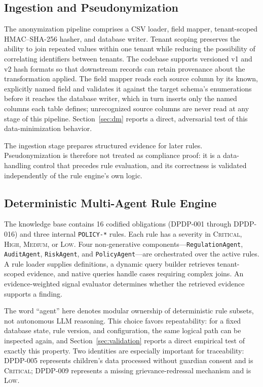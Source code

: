 \documentclass[11pt,a4paper]{article}
\begin{document}
\subsection{Ingestion and Pseudonymization}
The anonymization pipeline comprises a CSV loader, field mapper, tenant-scoped HMAC--SHA-256 hasher, and database writer. Tenant scoping preserves the ability to join repeated values within one tenant while reducing the possibility of correlating identifiers between tenants. The codebase supports versioned v1 and v2 hash formats so that downstream records can retain provenance about the transformation applied. The field mapper reads each source column by its known, explicitly named field and validates it against the target schema's enumerations before it reaches the database writer, which in turn inserts only the named columns each table defines; unrecognized source columns are never read at any stage of this pipeline. Section~\ref{sec:dm} reports a direct, adversarial test of this data-minimization behavior.

The ingestion stage prepares structured evidence for later rules. Pseudonymization is therefore not treated as compliance proof: it is a data-handling control that precedes rule evaluation, and its correctness is validated independently of the rule engine's own logic.

\subsection{Deterministic Multi-Agent Rule Engine}
The knowledge base contains 16 codified obligations (DPDP-001 through DPDP-016) and three internal \texttt{POLICY-*} rules. Each rule has a severity in \textsc{Critical}, \textsc{High}, \textsc{Medium}, or \textsc{Low}. Four non-generative components---\texttt{RegulationAgent}, \texttt{AuditAgent}, \texttt{RiskAgent}, and \texttt{PolicyAgent}---are orchestrated over the active rules. A rule loader supplies definitions, a dynamic query builder retrieves tenant-scoped evidence, and native queries handle cases requiring complex joins. An evidence-weighted signal evaluator determines whether the retrieved evidence supports a finding.

The word ``agent'' here denotes modular ownership of deterministic rule subsets, not autonomous LLM reasoning. This choice favors repeatability: for a fixed database state, rule version, and configuration, the same logical path can be inspected again, and Section~\ref{sec:validation} reports a direct empirical test of exactly this property. Two identities are especially important for traceability: DPDP-005 represents children's data processed without guardian consent and is \textsc{Critical}; DPDP-009 represents a missing grievance-redressal mechanism and is \textsc{Low}.
\end{document}
